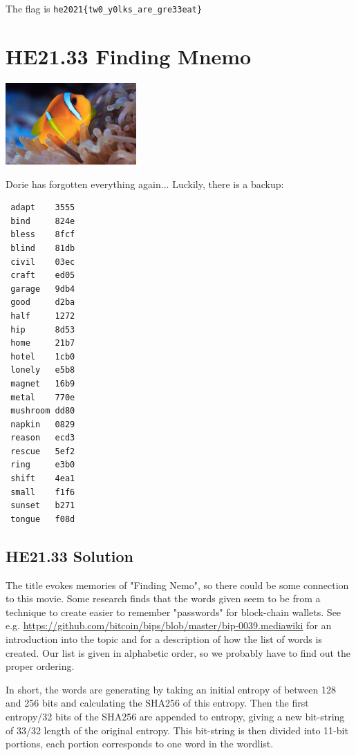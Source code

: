 \documentclass[english,a4paper,nols,noindent]{tufte-handout}
\begin{document}
The flag is \verb+he2021{tw0_y0lks_are_gre33eat}+

\hypertarget{he21.33}{%
\section{HE21.33 Finding Mnemo}
  \label{he21.33}}
\begin{marginfigure}
    \includegraphics[width=50mm]{images/challenge33.jpg}
\end{marginfigure}

\noindent Dorie has forgotten everything again... Luckily, there is a backup:

\begin{verbatim} 
 adapt    3555  
 bind     824e  
 bless    8fcf  
 blind    81db  
 civil    03ec  
 craft    ed05  
 garage   9db4  
 good     d2ba  
 half     1272   
 hip      8d53  
 home     21b7  
 hotel    1cb0  
 lonely   e5b8  
 magnet   16b9  
 metal    770e  
 mushroom dd80  
 napkin   0829  
 reason   ecd3  
 rescue   5ef2  
 ring     e3b0  
 shift    4ea1  
 small    f1f6  
 sunset   b271  
 tongue   f08d  
\end{verbatim} 


\hypertarget{he21.33-solution}{%
\subsection{HE21.33 Solution}\label{he21.33-solution}}

\noindent The title evokes memories of "Finding Nemo", so there could be some
connection to this movie.  Some research finds that the words given seem to be
from a technique to create easier to remember "passwords" for block-chain
wallets.  See e.g.
\url{https://github.com/bitcoin/bips/blob/master/bip-0039.mediawiki} for an
introduction into the topic and for a description of how the list of words is
created.  Our list is given in alphabetic order, so we probably have to find out
the proper ordering.

In short, the words are generating by taking an initial entropy of between 128
and 256 bits and calculating the
SHA256 of this entropy. Then the first entropy/32 bits of the SHA256 are
appended to entropy, giving a new bit-string of 33/32 length of the original
entropy.  This bit-string is then divided into 11-bit portions, each portion
corresponds to one word in the wordlist.
\end{document}
